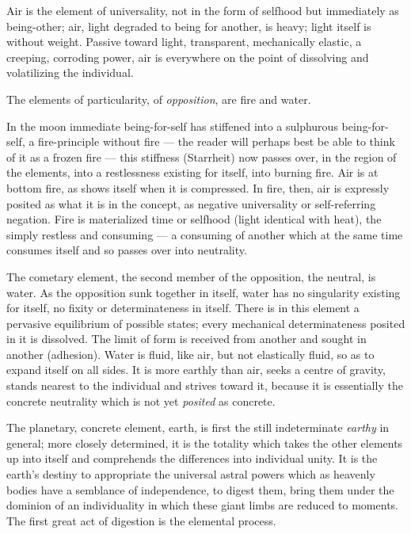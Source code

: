 \documentclass[12pt,a4paper]{book}
\begin{document}
Air is the element of universality, not in the form of selfhood but immediately as being-other; air, light degraded to
being for another, is heavy; light itself is without weight. Passive toward light, transparent, mechanically elastic,
a creeping, corroding power, air is everywhere on the point of dissolving and volatilizing the individual.

The elements of particularity, of \emph{opposition}, are fire and water.

In the moon immediate being-for-self has stiffened into a sulphurous being-for-self, a fire-principle without fire ---
the reader will perhaps best be able to think of it as a frozen fire --- this stiffness (Starrheit) now passes over,
in the region of the elements, into a restlessness existing for itself, into burning fire. Air is at bottom fire, as
shows itself when it is compressed. In fire, then, air is expressly posited as what it is in the concept, as negative
universality or self-referring negation. Fire is materialized time or selfhood (light identical with heat), the simply
restless and consuming --- a consuming of another which at the same time consumes itself and so passes over into
neutrality.

The cometary element, the second member of the opposition, the neutral, is water. As the opposition sunk together in
itself,
water has no singularity existing for itself, no fixity or determinateness in itself. There is in this element a
pervasive equilibrium of possible states; every mechanical determinateness posited in it is dissolved. The limit of
form is received from another and sought in another (adhesion). Water is fluid, like air, but not elastically fluid,
so as to expand itself on all sides. It is more earthly than air, seeks a centre of gravity, stands nearest to the
individual and strives toward it, because it is essentially the concrete neutrality which is not yet \emph{posited} as
concrete.

The planetary, concrete element, earth, is first the still indeterminate \emph{earthy} in general; more closely
determined, it is the totality which takes the other elements up into itself and comprehends the differences into
individual unity. It is the earth's destiny to appropriate the universal astral powers which as heavenly bodies have a
semblance of independence, to digest them, bring them under the dominion of an individuality in which these giant
limbs are reduced to moments. The first great act of digestion is the elemental process.
\end{document}
